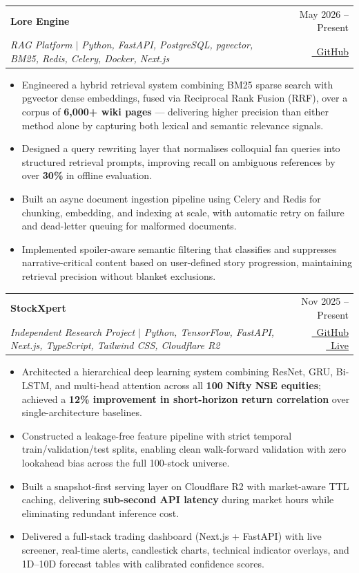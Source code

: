 \documentclass[a4paper,10.5pt]{article}
\makeatletter
\newcommand{\resumeProject}[4]{
\vspace{0.8mm}\item
    \begin{tabular*}{0.98\textwidth}[t]{l@{\extracolsep{\fill}}r}
        {\large\textbf{#1}} & \footnotesize{#2} \\
        \footnotesize{\textit{#3}} & \footnotesize{#4} \\
    \end{tabular*}
    \vspace{-2.0mm}
}
\newcommand{\resumeItemListStart}{\begin{justify}\begin{itemize}[leftmargin=3ex, rightmargin=2ex, noitemsep, labelsep=1.2mm, itemsep=0.4mm]\small}
\newcommand{\resumeItemListEnd}{\end{itemize}\end{justify}\vspace{-2mm}}
\makeatother
\begin{document}
    \resumeProject
      {Lore Engine}
      {May 2026 -- Present}
      {RAG Platform $|$ Python, FastAPI, PostgreSQL, pgvector, BM25, Redis, Celery, Docker, Next.js}
      {\href{https://github.com/Onkarj012/LoreEngine}{\faGithub\ GitHub}}
      \resumeItemListStart
        \item {Engineered a hybrid retrieval system combining BM25 sparse search with pgvector dense embeddings, fused via Reciprocal Rank Fusion (RRF), over a corpus of \textbf{6,000+ wiki pages} --- delivering higher precision than either method alone by capturing both lexical and semantic relevance signals.}
        \item {Designed a query rewriting layer that normalises colloquial fan queries into structured retrieval prompts, improving recall on ambiguous references by over \textbf{30\%} in offline evaluation.}
        \item {Built an async document ingestion pipeline using Celery and Redis for chunking, embedding, and indexing at scale, with automatic retry on failure and dead-letter queuing for malformed documents.}
        \item {Implemented spoiler-aware semantic filtering that classifies and suppresses narrative-critical content based on user-defined story progression, maintaining retrieval precision without blanket exclusions.}
      \resumeItemListEnd
    \vspace{-1mm}

    \resumeProject
      {StockXpert}
      {Nov 2025 -- Present}
      {Independent Research Project $|$ Python, TensorFlow, FastAPI, Next.js, TypeScript, Tailwind CSS, Cloudflare R2}
      {\href{https://github.com/Onkarj012/StockXpert}{\faGithub\ GitHub} \quad \href{https://stockxpert.vercel.app}{\faGlobe\ Live}}
      \resumeItemListStart
        \item {Architected a hierarchical deep learning system combining ResNet, GRU, Bi-LSTM, and multi-head attention across all \textbf{100 Nifty NSE equities}; achieved a \textbf{12\% improvement in short-horizon return correlation} over single-architecture baselines.}
        \item {Constructed a leakage-free feature pipeline with strict temporal train/validation/test splits, enabling clean walk-forward validation with zero lookahead bias across the full 100-stock universe.}
        \item {Built a snapshot-first serving layer on Cloudflare R2 with market-aware TTL caching, delivering \textbf{sub-second API latency} during market hours while eliminating redundant inference cost.}
        \item {Delivered a full-stack trading dashboard (Next.js + FastAPI) with live screener, real-time alerts, candlestick charts, technical indicator overlays, and 1D--10D forecast tables with calibrated confidence scores.}
      \resumeItemListEnd
\end{document}
